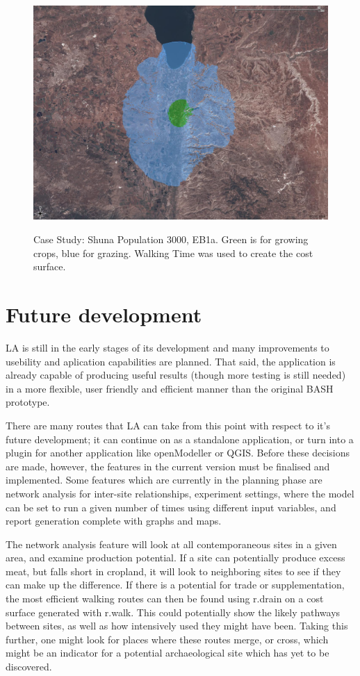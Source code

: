  \begin{figure}[htbp] %
  \includegraphics[scale=0.225]{./images/LEB130007030FallowSlope.jpg}
  \label{fig:caseStudy} \caption{Case Study: Shuna  Population 3000, EB1a. 
Green is for growing crops, blue for grazing.  Walking Time was used to create
the cost surface.}
  \end{figure}

\section{Future development} \label{FuturePlans} 

LA is still in the early stages of its development and many
improvements to usebility and aplication capabilities are planned. That said,
the application is already capable of producing useful results (though more
testing is still needed) in a more flexible, user friendly and efficient manner
than the original BASH prototype.

There are many routes that LA can take from this point with
respect to it's future development; it can continue on as a standalone
application, or turn into a plugin for another application like openModeller or
QGIS.  Before these decisions are made, however, the features in the current
version must be finalised and implemented.  Some features which are currently
in the planning phase are network analysis  for inter-site relationships,
experiment settings, where the model can be set to run a given number of times
using different input variables, and report generation complete with graphs and
maps. 

The network analysis feature will look at all contemporaneous sites in a given
area, and examine production potential.  If a site can potentially produce
excess meat, but falls short in cropland, it will look to neighboring sites to
see if they can make up the difference.  If there is a potential for trade or
supplementation, the most efficient walking routes can then be found using
r.drain on a cost surface generated with r.walk.  This could potentially show
the likely pathways between sites, as well as how intensively used they might
have been.  Taking this further, one might look for places where these routes
merge, or cross, which might be an indicator for a potential archaeological
site which has yet to be discovered.

